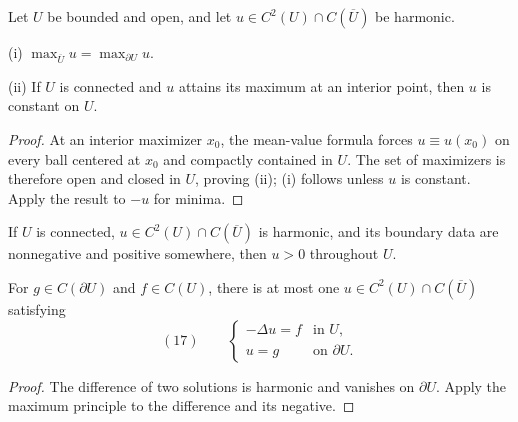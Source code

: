 \begin{theorem}
\label{thm:strong-maximum-principle-laplace}



Let $U$ be bounded and open, and let
$u\in C^2(U)\cap C(\overline U)$ be harmonic.

(i) $\max_{\overline U}u=\max_{\partial U}u$.

(ii) If $U$ is connected and $u$ attains its maximum at an interior point,
then $u$ is constant on $U$.
\end{theorem}
\begin{proof}
\sketch At an interior maximizer $x_0$, the mean-value formula forces
$u\equiv u(x_0)$ on every ball centered at $x_0$ and compactly contained in
$U$. The set of maximizers is therefore open and closed in $U$, proving (ii);
(i) follows unless $u$ is constant. Apply the result to $-u$ for minima.
\end{proof}

\begin{remark}
\label{rem:strong-maximum-principle-positivity}



If $U$ is connected, $u\in C^2(U)\cap C(\overline U)$ is harmonic, and its
boundary data are nonnegative and positive somewhere, then $u>0$ throughout
$U$.
\end{remark}

\begin{theorem}[Uniqueness]
\label{thm:uniqueness-poisson-dirichlet}



For $g\in C(\partial U)$ and $f\in C(U)$, there is at most one
$u\in C^2(U)\cap C(\overline U)$ satisfying
$$(17)\qquad
\begin{cases}
-\Delta u=f&\text{in }U,\\
u=g&\text{on }\partial U.
\end{cases}$$
\end{theorem}
\begin{proof}
\sketch The difference of two solutions is harmonic and vanishes on
$\partial U$. Apply the maximum principle to the difference and its negative.
\end{proof}

